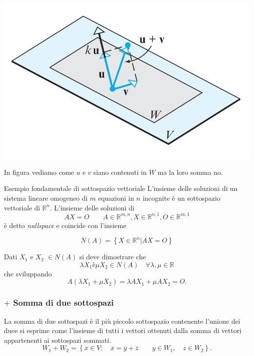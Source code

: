 \documentclass[x11names]{article}
\begin{document}
\begin{center}
\includegraphics[scale=0.25]{figures/subspace.png}
\end{center}
In figura vediamo come $u$ e $v$ siano contenuti in $W$ ma la loro somma no.

\begin{es}{Esempio fondamentale di sottospazio vettoriale}
L'insieme delle soluzioni di un sistema lineare omogeneo di $m$ equazioni in $n$ incognite è un sottospazio vettoriale di $\mathbb{R}^n$. L'insieme delle soluzioni di 
\[
AX = O \qquad A \in \mathbb{R}^{m,n}, X \in \mathbb{R}^{n,1}, O \in \mathbb{R}^{m,1}
\] 
è detto \textit{nullspace} e coincide con l'insieme

\[
N\left(A\right) = \left\{ X \in \mathbb{R}^n | AX = O  \right\}
\]

Dati $X_1$ e $X_2$ $\in N\left(A\right)$ si deve dimostrare che 
\[
\lambda X_1 è \mu X_2 \in N\left(A\right) \quad \forall \lambda,\mu \in \mathbb{R}
\] 
che sviluppando
\[
A\left(\lambda X_1 + \mu X_2\right) = \lambda AX_1 + \mu AX_2 = O
.\] 
\end{es}


\subsubsection{$+$ Somma di due sottospazi}
La somma di due sottospazi è il più piccolo sottospazio contenente l'unione dei duee si esprime come l'insieme di tutti i vettori ottenuti dalla somma di vettori appartenenti ai sottospazi sommati.
\[
W_1 + W_2  = \left\{\overline{x} \in V: \quad \overline{x} = \overline{y}+\overline{z}  \qquad y \in W_1, \quad z \in W_2\right\}
.\] 
\end{document}

